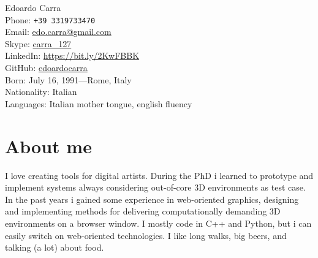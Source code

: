 \documentclass[10pt, a4paper]{article} %
\begin{document}


{\LARGE Edoardo Carra}\\ %

Phone: \texttt{+39 3319733470}\\ %
Email: \href{mailto:edo.carra@gmail.com}{edo.carra@gmail.com}\\ %
Skype: \href{https://join.skype.com/invite/gQN9qtZGLZ7r}{carra\_127}\\
LinkedIn: \href{https://www.linkedin.com/in/edoardocarra/}{https://bit.ly/2KwFBBK}\\ %
GitHub: \href{https://github.com/edoardocarra}{edoardocarra}\\


Born: July 16, 1991---Rome, Italy\\ %
Nationality: Italian\\ %
Languages: Italian mother tongue, english fluency

\section*{About me}

I love creating tools for digital artists. During the PhD i learned to prototype and implement systems always considering out-of-core 3D environments as test case.  In the past years i gained some experience in web-oriented graphics, designing and implementing methods for delivering computationally demanding 3D environments on a browser window. I mostly code in C++ and Python, but i can easily switch on web-oriented technologies. I like long walks, big beers, and talking (a lot) about food.

\end{document}
